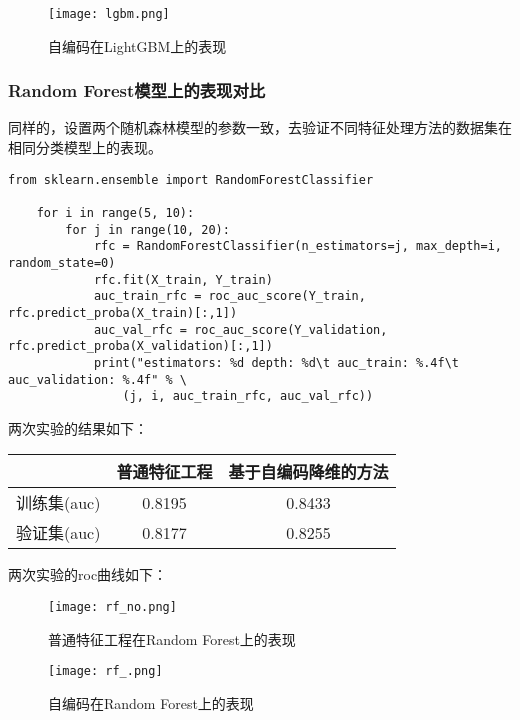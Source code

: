 \begin{figure}[H]
    \centering
    \texttt{[image: lgbm.png]}
    \caption{自编码在LightGBM上的表现}
    \label{fig:lgbm}
\end{figure}


\subsubsection{Random Forest模型上的表现对比}
同样的，设置两个随机森林模型的参数一致，去验证不同特征处理方法的数据集在相同分类模型上的表现。

\begin{lstlisting}[frame=shadowbox]
    from sklearn.ensemble import RandomForestClassifier

    for i in range(5, 10):
        for j in range(10, 20):
            rfc = RandomForestClassifier(n_estimators=j, max_depth=i, random_state=0)
            rfc.fit(X_train, Y_train)
            auc_train_rfc = roc_auc_score(Y_train, rfc.predict_proba(X_train)[:,1])
            auc_val_rfc = roc_auc_score(Y_validation, rfc.predict_proba(X_validation)[:,1])
            print("estimators: %d depth: %d\t auc_train: %.4f\t auc_validation: %.4f" % \
                (j, i, auc_train_rfc, auc_val_rfc))
\end{lstlisting}

两次实验的结果如下：\\

\begin{center}
    \begin{tabular}{ccc}
        \hline
                    & 普通特征工程 & 基于自编码降维的方法 \\
        \hline
        训练集(auc) & 0.8195       & 0.8433               \\
        \hline
        验证集(auc) & 0.8177       & 0.8255               \\
        \hline
    \end{tabular}
\end{center}

两次实验的roc曲线如下：
\begin{figure}[H]
    \centering
    \texttt{[image: rf\_no.png]}
    \caption{普通特征工程在Random Forest上的表现}
    \label{fig:rf_no}
\end{figure}

\begin{figure}[H]
    \centering
    \texttt{[image: rf\_.png]}
    \caption{自编码在Random Forest上的表现}
    \label{fig:rf}
\end{figure}

